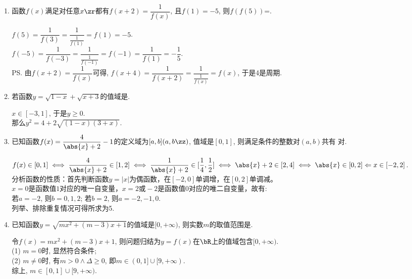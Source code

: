 \begin{enumerate}
\begin{jieda}
\ps 函数首先看定义域. 
\end{jieda}


\item 函数$f(x)$满足对任意$x\zr$都有$f(x+2)=\dfrac{1}{f(x)}$, 且$f(1)=-5$, 则$f(f(5))$=.
\begin{jieda}
$f(5)=\dfrac{1}{f(3)}=\dfrac{1}{\frac{1}{f(1)}}=f(1)=-5$. \\
$f(-5)=\dfrac{1}{f(-3)}=\dfrac{1}{\frac{1}{f(-1)}}=f(-1)=\dfrac{1}{f(1)}=-\dfrac{1}{5}$. \\
\ps 由$f(x+2)=\dfrac{1}{f(x)}$可得, $f(x+4)=\dfrac{1}{f(x+2)}=\dfrac{1}{\frac{1}{f(x)}}=f(x)$, 于是4是周期. 
\end{jieda}


\item 若函数$y=\sqrt{1-x}+\sqrt{x+3}$的值域是\blkda{$[2,2\sqrt{2}]$}. 
\begin{jieda}
$x\in[-3,1]$, 于是$y\geq 0$. \\
那么$y^2=4+2\sqrt{(1-x)(3+x)}$. 
\end{jieda}


\item 已知函数$f(x)=\dfrac{4}{\abs{x}+2}-1$的定义域为$[a,b](a,b\zz)$, 值域是$[0,1]$, 则满足条件的整数对$(a,b)$共有 对. 
\begin{jieda}
    $f(x)\in[0,1] \iff \dfrac{4}{\abs{x}+2} \in [1, 2] \iff \dfrac{1}{\abs{x}+2} \in [\dfrac{1}{4}, \dfrac{1}{2}] \iff \abs{x}+2 \in [2, 4] \iff \abs{x}\in[0,2] \Leftarrow  x\in[-2,2]$. \\
    分析函数的性质：首先判断函数$y = |x|$为偶函数，在$[-2, 0]$单调增，在$[0, 2]$单调减。\\
    $x = 0$是函数值$1$对应的唯一自变量，$x = 2 \mbox{或} -2$是函数值$0$对应的唯二自变量，故有: \\
    若$a=-2$, 则$b=0,1,2$; 若$b=2$, 则$a=-2,-1,0$. \\
    列举、排除重复情况可得所求为5. 
\end{jieda}



\item 已知函数$y=\sqrt{mx^2+(m-3)x+1}$的值域是$[0,+\infty)$, 则实数$m$的取值范围是\blkda[2.5]{$[0,1]\cup[9,+\infty)$}. 
\begin{jieda}
令$f(x)=mx^2+(m-3)x+1$, 则问题归结为$y=f(x)$在$\bR$上的值域包含$[0,+\infty)$. \\
(1) $m=0$时, 显然符合条件; \\
(2) $m\neq 0$时, 有$m>0\land\Delta\geq 0$, 即$m\in(0,1]\cup[9,+\infty)$. \\
综上, $m\in[0,1]\cup[9,+\infty)$. 
\end{jieda}




\end{enumerate}
